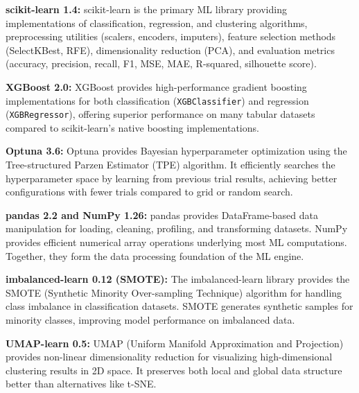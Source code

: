 \documentclass[12pt,a4paper]{report}
\begin{document}
\vspace{0.4cm}

\textbf{scikit-learn 1.4:}
scikit-learn is the primary ML library providing implementations of classification, regression, and clustering algorithms, preprocessing utilities (scalers, encoders, imputers), feature selection methods (SelectKBest, RFE), dimensionality reduction (PCA), and evaluation metrics (accuracy, precision, recall, F1, MSE, MAE, R-squared, silhouette score).

\vspace{0.4cm}

\textbf{XGBoost 2.0:}
XGBoost provides high-performance gradient boosting implementations for both classification (\texttt{XGBClassifier}) and regression (\texttt{XGBRegressor}), offering superior performance on many tabular datasets compared to scikit-learn's native boosting implementations.

\vspace{0.4cm}

\textbf{Optuna 3.6:}
Optuna provides Bayesian hyperparameter optimization using the Tree-structured Parzen Estimator (TPE) algorithm. It efficiently searches the hyperparameter space by learning from previous trial results, achieving better configurations with fewer trials compared to grid or random search.

\vspace{0.4cm}

\textbf{pandas 2.2 and NumPy 1.26:}
pandas provides DataFrame-based data manipulation for loading, cleaning, profiling, and transforming datasets. NumPy provides efficient numerical array operations underlying most ML computations. Together, they form the data processing foundation of the ML engine.

\vspace{0.4cm}

\textbf{imbalanced-learn 0.12 (SMOTE):}
The imbalanced-learn library provides the SMOTE (Synthetic Minority Over-sampling Technique) algorithm for handling class imbalance in classification datasets. SMOTE generates synthetic samples for minority classes, improving model performance on imbalanced data.

\vspace{0.4cm}

\textbf{UMAP-learn 0.5:}
UMAP (Uniform Manifold Approximation and Projection) provides non-linear dimensionality reduction for visualizing high-dimensional clustering results in 2D space. It preserves both local and global data structure better than alternatives like t-SNE.
\end{document}
